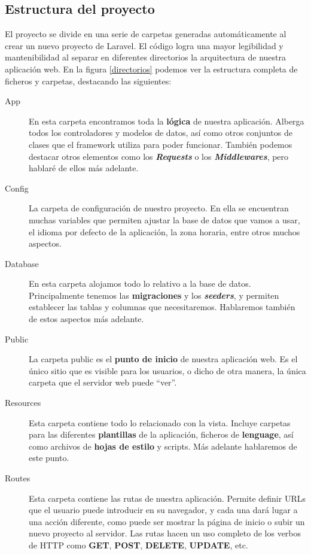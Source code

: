 \subsection{Estructura del proyecto}
El proyecto se divide en una serie de carpetas generadas automáticamente al crear un nuevo proyecto de Laravel. El código logra una mayor legibilidad y mantenibilidad al separar en diferentes directorios la arquitectura de nuestra aplicación web. En la figura \ref{directorios} podemos ver la estructura completa de ficheros y carpetas, destacando las siguientes:

\begin{description}
    \item [App] En esta carpeta encontramos toda la \textbf{lógica} de nuestra aplicación. Alberga todos los controladores y modelos de datos, así como otros conjuntos de clases que el framework utiliza para poder funcionar. También podemos destacar otros elementos como los \textbf{\textit{Requests}} o los \textbf{\textit{Middlewares}}, pero hablaré de ellos más adelante.
    \item [Config] La carpeta de configuración de nuestro proyecto. En ella se encuentran muchas variables que permiten ajustar la base de datos que vamos a usar, el idioma por defecto de la aplicación, la zona horaria, entre otros muchos aspectos.
    \item [Database] En esta carpeta alojamos todo lo relativo a la base de datos. Principalmente tenemos las \textbf{migraciones} y los \textbf{\textit{seeders}}, y permiten establecer las tablas y columnas que necesitaremos. Hablaremos también de estos aspectos más adelante.
    \item [Public] La carpeta public es el \textbf{punto de inicio} de nuestra aplicación web. Es el único sitio que es visible para los usuarios, o dicho de otra manera, la única carpeta que el servidor web puede ``ver''.
    \item [Resources] Esta carpeta contiene todo lo relacionado con la vista. Incluye carpetas para las diferentes \textbf{plantillas} de la aplicación, ficheros de \textbf{lenguage}, así como archivos de \textbf{hojas de estilo} y scripts. Más adelante hablaremos de este punto.
    \item [Routes] Esta carpeta contiene las rutas de nuestra aplicación. Permite definir URLs que el usuario puede introducir en su navegador, y cada una dará lugar a una acción diferente, como puede ser mostrar la página de inicio o subir un nuevo proyecto al servidor. Las rutas hacen un uso completo de los verbos de HTTP como \textbf{GET}, \textbf{POST}, \textbf{DELETE}, \textbf{UPDATE}, etc.
\end{description}

